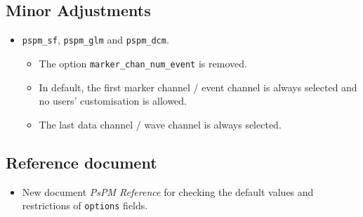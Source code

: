 \documentclass[english]{article}
\numberwithin{equation}{section}
\numberwithin{figure}{section}
\begin{document}
\subsection*{Minor Adjustments}
    \begin{itemize}
    	\item \texttt{pspm\_sf}, \texttt{pspm\_glm} and \texttt{pspm\_dcm}.
    	\begin{itemize}
    		\item The option \texttt{marker\_chan\_num\_event} is removed.
    		\item In default, the first marker channel / event channel is always selected and no users' customisation is allowed.
    		\item The last data channel / wave channel is always selected.
    	\end{itemize}
    \end{itemize}
\subsection*{Reference document}
    \begin{itemize}
    	\item New document \textit{PsPM Reference} for checking the default values and restrictions of \texttt{options} fields.
    \end{itemize}



\end{document}
